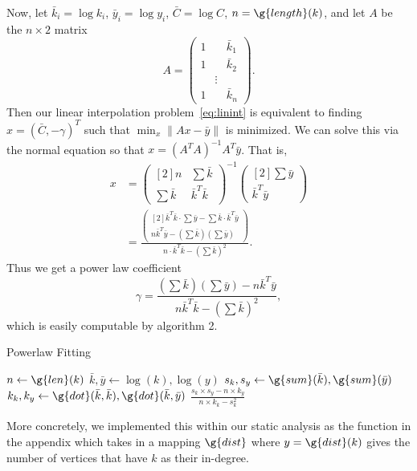 \documentclass[11pt,a4paper,twocolumn]{article}
\begin{document}
\begin{singlespace}
Now, let $\bar{k}_i=\log k_i$, $\bar{y}_i=\log y_i$,
$\bar{C}=\log C$, $n=\g{length}(k)$, and let $A$ be the $n\times 2$ matrix
\[A=\begin{pmatrix}1&&\bar{k}_1\\ 1&&\bar{k}_2\\ &\vdots&\\ 1&&\bar{k}_n
\end{pmatrix}.\]
Then our linear interpolation problem~\eqref{eq:linint} is equivalent to finding
$x=\left(\bar{C},-\gamma\right)^T$ such that $\min_x \|Ax-\bar{y}\|$ is
minimized. We can solve this via the normal equation \cite{mcomp} so that
$x=\left(A^T A\right)^{-1} A^T\bar{y}$. That is,
\begin{align*}x&=\begin{pmatrix}[2]n&\sum \bar{k}\\
\sum \bar{k} & \bar{k}^T\bar{k}\end{pmatrix}^{-1}
\begin{pmatrix}[2]\sum \bar{y}\\ \bar{k}^T\bar{y}\end{pmatrix}\\
&=\frac{
\begin{pmatrix}[2]\bar{k}^T\bar{k}\cdot\sum\bar{y}-\sum\bar{k}\cdot
\bar{k}^T\bar{y}\\ n\bar{k}^T\bar{y}-\left(\sum \bar{k}\right)
\left(\sum\bar{y}\right)\end{pmatrix}
}{n\cdot\bar{k}^T\bar{k}-\left(\sum \bar{k}\right)^2}.\end{align*}
Thus we get a power law coefficient
\begin{equation} \label{eq:gamma}
\gamma=\frac{\left(\sum\bar{k}\right)\left(\sum \bar{y}\right)
-n\bar{k}^T\bar{y}}{n\bar{k}^T\bar{k}-\left(\sum \bar{k}\right)^2},
\end{equation}
which is easily computable by algorithm 2.
\begin{algorithm}
\caption{Powerlaw Fitting}
\begin{algorithmic}
\State $n \gets \g{len}(k)$
\State $\bar k, \bar y \gets \log(k), \log(y)$
\State $s_k, s_y \gets \g{sum}(\bar k), \g{sum}(\bar y)$
\State $k_k, k_y \gets \g{dot}(\bar k, \bar k), \g{dot}(\bar k, \bar y)$
\State \Return $\frac{s_k \times s_y - n \times k_y}{n \times k_k - s_k^2}$
\EndFunction
\end{algorithmic}
\end{algorithm}
More concretely, we implemented this within our static analysis as the function 
 in the appendix which takes in a mapping $\g{dist}$ where 
$y = \g{dist}(k)$ gives the 
number of vertices that have $k$ as their in-degree.


\end{singlespace}
\end{document}
